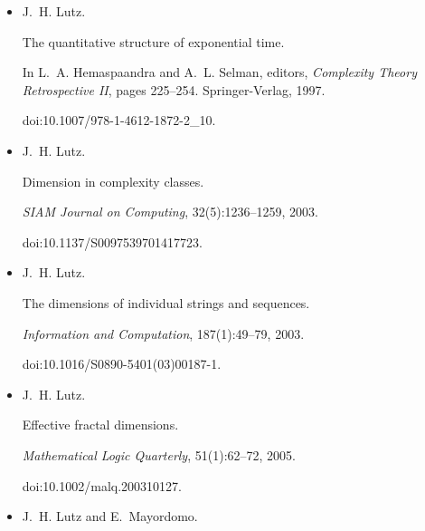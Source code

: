 \documentclass[10pt,a4paper]{article}
\begin{document}
\begin{itemize}
J. H. Lutz.


Almost everywhere high nonuniform complexity.


\emph{Journal of Computer and System Sciences}, 44(2):220–258, 1992.


doi:10.1016/0022-0000(92)90020-j.





\item[] 
[51]

J. H. Lutz.


The quantitative structure of exponential time.


In L. A. Hemaspaandra and A. L. Selman, editors, \emph{Complexity
Theory Retrospective II}, pages 225–254. Springer-Verlag, 1997.


doi:10.1007/978-1-4612-1872-2\_10.





\item[] 
[52]

J. H. Lutz.


Dimension in complexity classes.


\emph{SIAM Journal on Computing}, 32(5):1236–1259, 2003.


doi:10.1137/S0097539701417723.





\item[] 
[53]

J. H. Lutz.


The dimensions of individual strings and sequences.


\emph{Information and Computation}, 187(1):49–79, 2003.


doi:10.1016/S0890-5401(03)00187-1.





\item[] 
[54]

J. H. Lutz.


Effective fractal dimensions.


\emph{Mathematical Logic Quarterly}, 51(1):62–72, 2005.


doi:10.1002/malq.200310127.





\item[] 
[55]

J. H. Lutz and E. Mayordomo.



\end{itemize}
\end{document}
